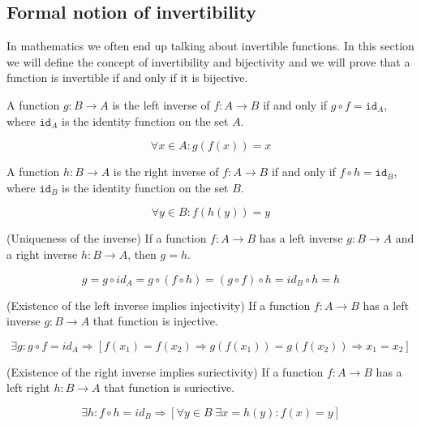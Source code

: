 \subsection{Formal notion of invertibility}
In mathematics we often end up talking about invertible functions. In this section 
we will define the concept of invertibility and bijectivity 
and we will prove that a function is invertible if and only if it is bijective.

\begin{definition}
A function $g : B \rightarrow A$ is the left inverse of $f : A \rightarrow B$ if 
and only if $ g \circ f = \texttt{id}_A$, where $\texttt{id}_A$ is the identity function on the set $A$.

$$ \forall x \in A : g(f(x)) = x $$
\end{definition}


\begin{definition}
A function $h : B \rightarrow A$ is the right inverse of $f : A \rightarrow B$ if 
and only if $ f \circ h = \texttt{id}_B$, where $\texttt{id}_B$ is the identity function on the set $B$.

$$ \forall y \in B : f(h(y)) = y $$
\end{definition}


\begin{lemma}(Uniqueness of the inverse)
If a function $f : A \rightarrow B$ has a left inverse $g : B \rightarrow A$ and a right inverse $h : B \rightarrow A$, then $g = h$.

$$ g = g \circ id_A = g \circ (f \circ h) = (g \circ f) \circ h = id_B \circ h = h $$
\end{lemma}

\begin{lemma}(Existence of the left inverse implies injectivity)
If a function $f : A \rightarrow B$ has a left inverse $g : B \rightarrow A$ that function is injective.

$$ \exists g : g \circ f = id_A \Rightarrow [f(x_1) = f(x_2) \Rightarrow g(f(x_1)) = g(f(x_2)) \Rightarrow x_1 = x_2] $$ 
\end{lemma}

\begin{lemma}(Existence of the right inverse implies suriectivity)
If a function $f : A \rightarrow B$ has a left right $h : B \rightarrow A$ that function is suriective.

$$ \exists h : f \circ h = id_B \Rightarrow [\forall y \in B\; \exists x = h(y) : f(x) = y ] $$ 
\end{lemma}


